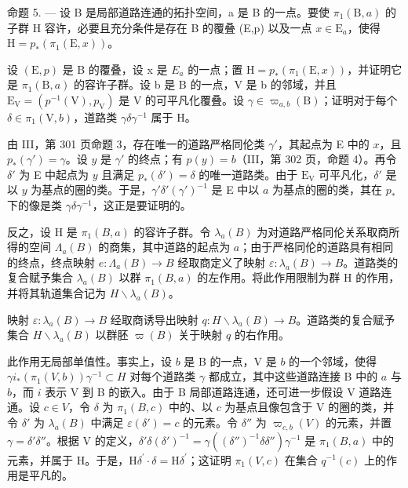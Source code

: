 命题 5. --- 设 B 是局部道路连通的拓扑空间，a 是 B 的一点。要使 \(\pi_1(\mathrm{B},a)\) 的子群 H 容许，必要且充分条件是存在 B 的覆叠 (E,p) 以及一点 \(x\in \mathrm{E}_a\)，使得 \(\mathrm{H} = p_{*}(\pi_{1}(\mathrm{E},x))\)。

设 \((\mathrm{E},p)\) 是 B 的覆叠，设 x 是 \(E_{a}\) 的一点；置 \(\mathrm{H}=p_{*}(\pi_{1}(\mathrm{E},x))\)，并证明它是 \(\pi_{1}(\mathrm{B},a)\) 的容许子群。设 b 是 B 的一点，V 是 b 的邻域，并且 \(\mathrm{E}_{\mathrm{V}}=(p^{-1}(\mathrm{V}),p_{\mathrm{V}})\) 是 V 的可平凡化覆叠。设 \(\gamma\in\varpi_{a,b}(\mathrm{B})\)；证明对于每个 \(\delta\in\pi_{1}(\mathrm{V},b)\)，道路类 \(\gamma\delta\gamma^{-1}\) 属于 H。

由 III，第 301 页命题 3，存在唯一的道路严格同伦类 \(\gamma'\)，其起点为 E 中的 \(x\)，且 \(p_*(\gamma') = \gamma\)。设 \(y\) 是 \(\gamma'\) 的终点；有 \(p(y) = b\)（III，第 302 页，命题 4）。再令 \(\delta'\) 为 E 中起点为 \(y\) 且满足 \(p_*(\delta') = \delta\) 的唯一道路类。由于 \(\mathrm{E_V}\) 可平凡化，\(\delta'\) 是以 \(y\) 为基点的圈的类。于是，\(\gamma'\delta'(\gamma')^{-1}\) 是 E 中以 \(a\) 为基点的圈的类，其在 \(p_*\) 下的像是类 \(\gamma\delta\gamma^{-1}\)，这正是要证明的。

反之，设 H 是 \(\pi_1(B, a)\) 的容许子群。令 \(\lambda_a(B)\) 为对道路严格同伦关系取商所得的空间 \(\Lambda_a(B)\) 的商集，其中道路的起点为 \(a\)；由于严格同伦的道路具有相同的终点，终点映射 \(e: \Lambda_a(B) \to B\) 经取商定义了映射 \(\varepsilon: \lambda_a(B) \to B\)。道路类的复合赋予集合 \(\lambda_a(B)\) 以群 \(\pi_1(B, a)\) 的左作用。将此作用限制为群 H 的作用，并将其轨道集合记为 \(H\backslash\lambda_a(B)\)。

映射 \(\varepsilon\colon\lambda_{a}(B)\to B\) 经取商诱导出映射 \(q\colon H\backslash\lambda_{a}(B)\to B\)。道路类的复合赋予集合 \(H\backslash\lambda_a(B)\) 以群胚 \(\varpi(B)\) 关于映射 \(q\) 的右作用。

此作用无局部单值性。事实上，设 \(b\) 是 B 的一点，V 是 \(b\) 的一个邻域，使得 \(\gamma i_{*}(\pi_{1}(V,b))\gamma^{-1}\subset H\) 对每个道路类 \(\gamma\) 都成立，其中这些道路连接 B 中的 \(a\) 与 \(b\)，而 \(i\) 表示 V 到 B 的嵌入。由于 B 局部道路连通，还可进一步假设 V 道路连通。设 \(c\in V\)，令 \(\delta\) 为 \(\pi_1(B,c)\) 中的、以 \(c\) 为基点且像包含于 V 的圈的类，并令 \(\delta'\) 为 \(\lambda_a(B)\) 中满足 \(\varepsilon (\delta ') = c\) 的元素。令 \(\delta''\) 为 \(\varpi_{c,b}(V)\) 的元素，并置 \(\gamma = \delta '\delta ''\)。根据 V 的定义，\(\delta '\delta (\delta ')^{-1} = \gamma ((\delta '')^{-1}\delta \delta '')\gamma^{-1}\) 是 \(\pi_1(B,a)\) 中的元素，并属于 H。于是，\(\mathrm{H}\delta^{\prime}\cdot \delta = \mathrm{H}\delta^{\prime}\)；这证明 \(\pi_1(V,c)\) 在集合 \(q^{-1}(c)\) 上的作用是平凡的。

